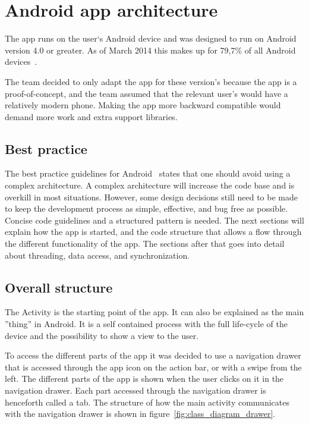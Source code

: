 \section{Android app architecture}
\label{sec:arch_app}
The app runs on the user`s Android device and was designed to run on Android version 4.0 or greater. As of March 2014 this makes up for 79,7\% of all Android devices~\cite{AndroidDeviceFragmentation}.

The team decided to only adapt the app for these version's because the app is a proof-of-concept, and the team assumed that the relevant user's would have a relatively modern phone. Making the app more backward compatible would demand more work and extra support libraries. 
%
%
\subsection{Best practice}

The best practice guidelines for Android~\cite{androidPracticePerformance} states that one should avoid using a complex architecture. A complex architecture will increase the code base and is overkill in most situations. However, some design decisions still need to be made to keep the development process as simple, effective, and bug free as possible. Concise code guidelines and a structured pattern is needed. The next sections will explain how the app is started, and the code structure that allows a flow through the different functionality of the app. The sections after that goes into detail about threading, data access, and synchronization.

\subsection{Overall structure}

The Activity is the starting point of the app. It can also be explained as the main ''thing'' in Android. It is a self contained process with the full life-cycle of the device and the possibility to show a view to the user.

To access the different parts of the app it was decided to use a navigation drawer that is accessed through the app icon on the action bar, or with a swipe from the left. The different parts of the app is shown when the user clicks on it in the navigation drawer. Each part accessed through the navigation drawer is henceforth called a tab. The structure of how the main activity communicates with the navigation drawer is shown in figure~\ref{fig:class_diagram_drawer}.

